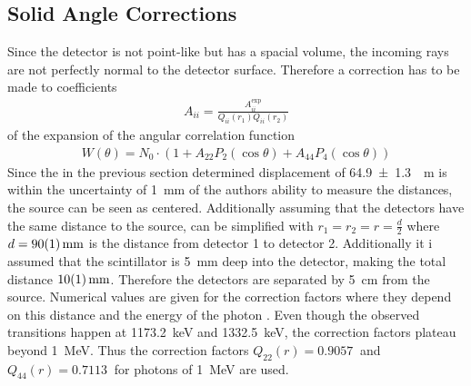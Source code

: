 \documentclass[sn-mathphys-num,icol]{sn-jnl}
\theoremstyle{thmstyleone}
\theoremstyle{thmstyletwo}
\theoremstyle{thmstylethree}
\begin{document}
\subsection{Solid Angle Corrections}
Since the detector is not point-like but has a spacial volume, the incoming rays are not perfectly normal to the detector surface. Therefore a correction has to be made to coefficients
\begin{align}
	A_{ii}=\frac{A_{ii}^\text{exp}}{Q_{ii}(r_1)Q_{ii}(r_2)}\label{eq:fds}
\end{align}
of the expansion of the angular correlation function
\begin{align}
	W(\theta)=N_0\cdot(1+A_{22}P_2(\cos\theta)+A_{44}P_4(\cos\theta))\label{eq:acf}
\end{align}
Since the in the previous section determined displacement of \SI{64.9\pm1.3}{\mu m} is within the uncertainty of \SI{1}{mm} of the authors ability to measure the distances, the source can be seen as centered. Additionally assuming that the detectors have the same distance to the source,  can be simplified with $r_1=r_2=r=\frac{d}{2}$ where $d=\SI{90+-1}{mm}$ is the distance from detector 1 to detector 2. Additionally it i assumed that the scintillator is \SI{5}{mm} deep into the detector, making the total distance $\SI{10+-1}{mm}$. Therefore the detectors are separated by \SI{5}{cm} from the source. Numerical values are given for the correction factors where they depend on this distance and the energy of the photon \cite{siegbahn}. Even though the observed transitions happen at \SI{1173.2}{keV} and \SI{1332.5}{keV}, the correction factors plateau beyond \SI{1}{MeV}. Thus the correction factors $Q_{22}(r)=\SI{0.9057}{}$ and $Q_{44}(r)=\SI{0.7113}{}$ for photons of \SI{1}{MeV} are used.
\end{document}

